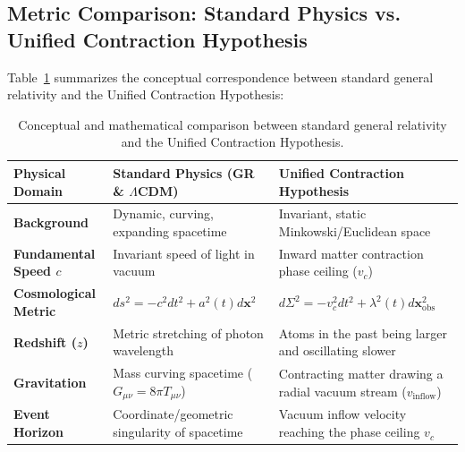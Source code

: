 \subsection{Metric Comparison: Standard Physics vs. Unified Contraction Hypothesis}

Table~\ref{tab:metrik_karsilastirma} summarizes the conceptual correspondence between standard general relativity and the Unified Contraction Hypothesis:

\begin{table}[h!]
    \centering
    \small
    \begin{tabular}{@{}lll@{}}
        \toprule
        \textbf{Physical Domain}       & \textbf{Standard Physics (GR \& $\Lambda$CDM)}                & \textbf{Unified Contraction Hypothesis}                               \\ \midrule
        \textbf{Background}            & Dynamic, curving, expanding spacetime                         & Invariant, static Minkowski/Euclidean space                           \\
        \textbf{Fundamental Speed $c$} & Invariant speed of light in vacuum                            & Inward matter contraction phase ceiling ($v_c$)                       \\
        \textbf{Cosmological Metric}   & $ds^2 = -c^2 dt^2 + a^2(t) d\mathbf{x}^2$                     & $d\Sigma^2 = -v_c^2 dt^2 + \lambda^2(t) d\mathbf{x}_{\mathrm{obs}}^2$ \\
        \textbf{Redshift ($z$)}        & Metric stretching of photon wavelength                        & Atoms in the past being larger and oscillating slower                 \\
        \textbf{Gravitation}           & Mass curving spacetime ($G_{\mu\nu} = 8\pi T_{\mu\nu}$)       & Contracting matter drawing a radial vacuum stream ($v_{\mathrm{inflow}}$) \\
        \textbf{Event Horizon}         & Coordinate/geometric singularity of spacetime                 & Vacuum inflow velocity reaching the phase ceiling $v_c$               \\ \bottomrule
    \end{tabular}
    \caption{Conceptual and mathematical comparison between standard general relativity and the Unified Contraction Hypothesis.}
    \label{tab:metrik_karsilastirma}
\end{table}
